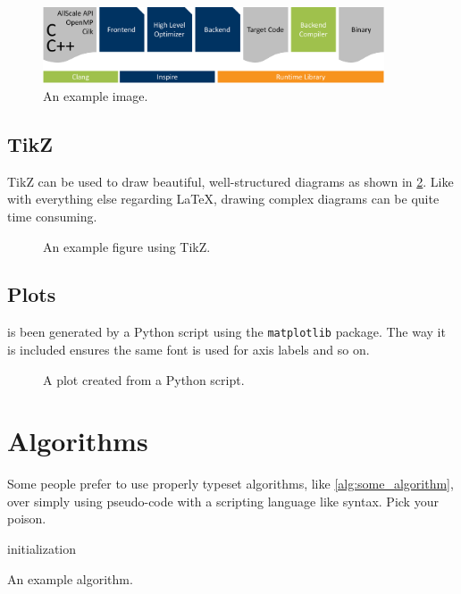 \begin{figure}
	\centering
	\includegraphics[width=0.9\textwidth]{images/example.pdf}
	\caption{An example image.}
	\label{fig:some_figure}
\end{figure}

\subsection{TikZ}

TikZ can be used to draw beautiful, well-structured diagrams as shown in \cref{fig:tikz_figure}.
Like with everything else regarding \LaTeX, drawing complex diagrams can be quite time consuming.

\begin{figure}
	\centering
	
	\caption{An example figure using TikZ.}
	\label{fig:tikz_figure}
\end{figure}

\subsection{Plots}

 is been generated by a Python script using the \texttt{matplotlib} package.
The way it is included ensures the same font is used for axis labels and so on.

\begin{figure}
	\centering
	
	\caption{A plot created from a Python script.}
	\label{fig:some_plot}
\end{figure}

\section{Algorithms}

Some people prefer to use properly typeset algorithms, like \cref{alg:some_algorithm}, over simply using pseudo-code with a scripting language like syntax.
Pick your poison.

\begin{algorithm}
	\capstart
	\BlankLine
	initialization\;
	\caption{An example algorithm.}
	\label{alg:some_algorithm}
\end{algorithm}

